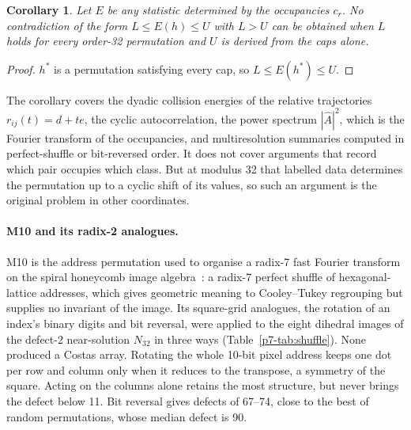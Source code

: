 \documentclass[11pt,a4paper,oneside]{report}
\newtheorem{corollary}[theorem]{Corollary}
\theoremstyle{definition}
\begin{document}
\begin{corollary}
\label{p7-cor:caps}
Let $E$ be any statistic determined by the occupancies $c_r$. No contradiction of the form
$L\le E(h)\le U$ with $L>U$ can be obtained when $L$ holds for every order-32 permutation and $U$ is
derived from the caps alone.
\end{corollary}
\begin{proof}
$h^\ast$ is a permutation satisfying every cap, so $L\le E(h^\ast)\le U$.
\end{proof}

The corollary covers the dyadic collision energies of the relative trajectories
$r_{ij}(t)=d+te$, the cyclic autocorrelation, the power spectrum $|\hat A|^2$, which is the Fourier
transform of the occupancies, and multiresolution summaries computed in perfect-shuffle or bit-reversed
order. It does not cover arguments that record which pair occupies which class. But at modulus 32 that
labelled data determines the permutation up to a cyclic shift of its values, so such an argument is the
original problem in other coordinates.

\paragraph{M10 and its radix-2 analogues.} M10 is the address permutation used to organise a radix-7
fast Fourier transform on the spiral honeycomb image algebra~\cite{p7-sheridan2005}: a radix-7 perfect
shuffle of hexagonal-lattice addresses, which gives geometric meaning to Cooley--Tukey regrouping but
supplies no invariant of the image. Its square-grid analogues, the rotation of an index's binary digits
and bit reversal, were applied to the eight dihedral images of the defect-2 near-solution $N_{32}$ in
three ways (Table~\ref{p7-tab:shuffle}). None produced a Costas array. Rotating the whole 10-bit pixel
address keeps one dot per row and column only when it reduces to the transpose, a symmetry of the
square. Acting on the columns alone retains the most structure, but never brings the defect below 11.
Bit reversal gives defects of 67--74, close to the best of random permutations, whose median defect is
90.
\end{document}
